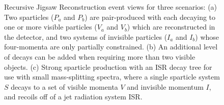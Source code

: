 \begin{figure}[tb]
\centering
{}
\caption{\label{fig:RJRTrees} 
Recursive Jigsaw Reconstruction event views for three scenarios: (a)
Two sparticles ($P_{a}$ and $P_{b}$) are pair-produced with each
decaying to one or more visible particles ($V_{a}$ and $V_{b}$) which
are reconstructed in the detector, and two systems of invisible
particles ($I_{a}$ and $I_{b}$) whose four-momenta are only partially
constrained. (b) An additional level of decays can be added when
requiring more than two visible objects. (c) Strong sparticle
production with an ISR decay tree for use with small mass-splitting
spectra, where a single sparticle system $S$ decays to a set of
visible momenta $V$ and invisible momentum $I$, and recoils off of a
jet radiation system ISR.  }
\end{figure}


